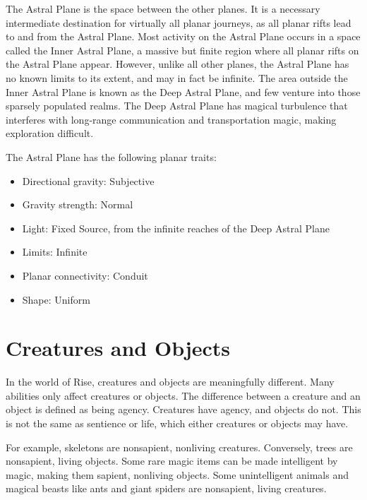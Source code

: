       The Astral Plane is the space between the other planes.
      It is a necessary intermediate destination for virtually all planar journeys, as all planar rifts lead to and from the Astral Plane.
      Most activity on the Astral Plane occurs in a space called the Inner Astral Plane, a massive but finite region where all planar rifts on the Astral Plane appear.
      However, unlike all other planes, the Astral Plane has no known limits to its extent, and may in fact be infinite.
      The area outside the Inner Astral Plane is known as the Deep Astral Plane, and few venture into those sparsely populated realms.
      The Deep Astral Plane has magical turbulence that interferes with long-range communication and transportation magic, making exploration difficult.

      The Astral Plane has the following planar traits:
      \begin{itemize}
        \item Directional gravity: Subjective
        \item Gravity strength: Normal
        \item Light: Fixed Source, from the infinite reaches of the Deep Astral Plane
        \item Limits: Infinite
        \item Planar connectivity: Conduit
        \item Shape: Uniform
      \end{itemize}

\section{Creatures and Objects}
  In the world of Rise, creatures and objects are meaningfully different.
  Many abilities only affect creatures or objects.
  The difference between a creature and an object is defined as being agency.
  Creatures have agency, and objects do not.
  This is not the same as sentience or life, which either creatures or objects may have.

  For example, skeletons are nonsapient, nonliving creatures.
  Conversely, trees are nonsapient, living objects.
  Some rare magic items can be made intelligent by magic, making them sapient, nonliving objects.
  Some unintelligent animals and magical beasts like ants and giant spiders are nonsapient, living creatures.

